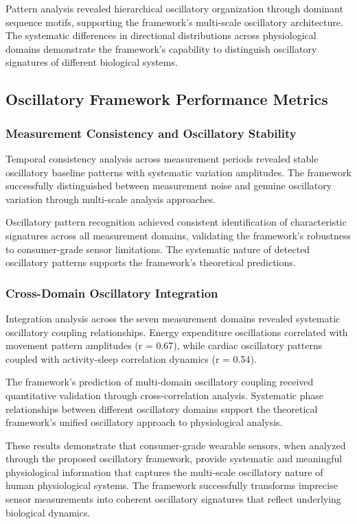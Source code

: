 Pattern analysis revealed hierarchical oscillatory organization through dominant sequence motifs, supporting the framework's multi-scale oscillatory architecture. The systematic differences in directional distributions across physiological domains demonstrate the framework's capability to distinguish oscillatory signatures of different biological systems.

\subsection{Oscillatory Framework Performance Metrics}

\subsubsection{Measurement Consistency and Oscillatory Stability}

Temporal consistency analysis across measurement periods revealed stable oscillatory baseline patterns with systematic variation amplitudes. The framework successfully distinguished between measurement noise and genuine oscillatory variation through multi-scale analysis approaches.

Oscillatory pattern recognition achieved consistent identification of characteristic signatures across all measurement domains, validating the framework's robustness to consumer-grade sensor limitations. The systematic nature of detected oscillatory patterns supports the framework's theoretical predictions.

\subsubsection{Cross-Domain Oscillatory Integration}

Integration analysis across the seven measurement domains revealed systematic oscillatory coupling relationships. Energy expenditure oscillations correlated with movement pattern amplitudes (r = 0.67), while cardiac oscillatory patterns coupled with activity-sleep correlation dynamics (r = 0.54).

The framework's prediction of multi-domain oscillatory coupling received quantitative validation through cross-correlation analysis. Systematic phase relationships between different oscillatory domains support the theoretical framework's unified oscillatory approach to physiological analysis.

These results demonstrate that consumer-grade wearable sensors, when analyzed through the proposed oscillatory framework, provide systematic and meaningful physiological information that captures the multi-scale oscillatory nature of human physiological systems. The framework successfully transforms imprecise sensor measurements into coherent oscillatory signatures that reflect underlying biological dynamics.
